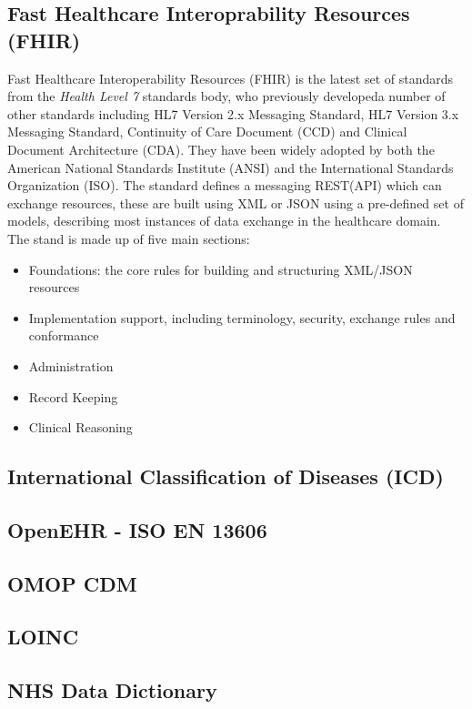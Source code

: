 \documentclass[runningheads]{llncs}
\begin{document}
	\subsection{Fast Healthcare Interoprability Resources (FHIR)}
    Fast Healthcare Interoperability Resources (FHIR) is the latest set of standards from the \emph{Health Level 7} standards body, who previously developeda number of other standards including HL7 Version 2.x Messaging Standard, HL7 Version 3.x Messaging Standard, Continuity of Care Document (CCD) and Clinical Document Architecture (CDA). They have been widely adopted by both the American National Standards Institute (ANSI) and the International Standards Organization (ISO). The standard defines a messaging REST(API) which can exchange resources, these are built using XML or JSON using a pre-defined set of models, describing most instances of data exchange in the healthcare domain.
    The stand is made up of five main sections:
    \begin{itemize}
    	\item Foundations: the core rules for building and structuring XML/JSON resources
    	\item Implementation support, including terminology, security, exchange rules and conformance
    	\item Administration
    	\item Record Keeping
    	\item Clinical Reasoning
    \end{itemize}
		
	\subsection{International Classification of Diseases (ICD)}
	
	
	\subsection{OpenEHR - ISO EN 13606}
	
	
	\subsection{OMOP CDM}
	
	\subsection{LOINC}
	
	\subsection{NHS Data Dictionary}
	
\end{document}
